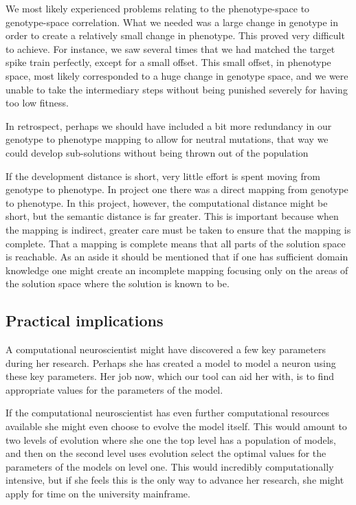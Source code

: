 \documentclass[a4paper]{article}
\begin{document}
We most likely experienced problems relating to the phenotype-space to genotype-space correlation. What we needed was a large change in genotype in order to create a relatively small change in phenotype. This proved very difficult to achieve. For instance, we saw several times that we had matched the target spike train perfectly, except for a small offset. This small offset, in phenotype space, most likely corresponded to a huge change in genotype space, and we were unable to take the intermediary steps without being punished severely for having too low fitness.

In retrospect, perhaps we should have included a bit more redundancy in our genotype to phenotype mapping to allow for neutral mutations, that way we could develop sub-solutions without being thrown out of the population

If the development distance is short, very little effort is spent moving from genotype to phenotype. In project one there was a direct mapping from genotype to phenotype. In this project, however, the computational distance might be short, but the semantic distance is far greater. This is important because when the mapping is indirect, greater care must be taken to ensure that the mapping is complete. That a mapping is complete means that all parts of the solution space is reachable. As an aside it should be mentioned that if one has sufficient domain knowledge one might create an incomplete mapping focusing only on the areas of the solution space where the solution is known to be.

\subsection{Practical implications}
\label{sec:pract-impl}

A computational neuroscientist might have discovered a few key parameters during her research. Perhaps she has created a model to model a neuron using these key parameters. Her job now, which our tool can aid her with, is to find appropriate values for the parameters of the model.

If the computational neuroscientist has even further computational resources available she might even choose to evolve the model itself. This would amount to two levels of evolution where she one the top level has a population of models, and then on the second level uses evolution select the optimal values for the parameters of the models on level one. This would incredibly computationally intensive, but if she feels this is the only way to advance her research, she might apply for time on the university mainframe.
\end{document}

